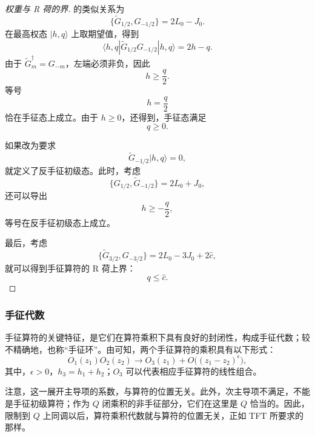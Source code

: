 \begin{proof}[权重与 R 荷的界]
的类似关系为
\[
\{\widetilde G_{1/2},G_{-1/2}\}=2L_0-J_0.
\]
在最高权态 $|h,q\rangle$ 上取期望值，得到
\[
\langle h,q|\widetilde G_{1/2}G_{-1/2}|h,q\rangle=2h-q.
\]
由于 $\widetilde G_m^\dagger=G_{-m}$，左端必须非负，因此
\begin{equation}\label{eq:3.95}
h\ge\frac q2.
\end{equation}
等号
\begin{equation}\label{eq:3.96}
h=\frac q2
\end{equation}
恰在手征态上成立。由于 $h\ge0$，还得到，手征态满足
\begin{equation}\label{eq:3.97}
q\ge0.
\end{equation}

如果改为要求
\[
\widetilde G_{-1/2}|h,q\rangle=0,
\]
就定义了反手征初级态。此时，考虑
\[
\{G_{1/2},\widetilde G_{-1/2}\}=2L_0+J_0,
\]
还可以导出
\[
h\ge-\frac q2,
\]
等号在反手征初级态上成立。

最后，考虑
\[
\{\widetilde G_{3/2},G_{-3/2}\}
=2L_0-3J_0+2\widehat c,
\]
就可以得到手征算符的 R 荷上界：
\begin{equation}\label{eq:3.98}
q\le\widehat c.
\end{equation}
\end{proof}

\subsubsection{手征代数}\label{sec:3.3.4.3}

手征算符的关键特征，是它们在算符乘积下具有良好的封闭性，构成手征代数；较不精确地，也称“手征环”。由可知，两个手征算符的乘积具有以下形式：
\begin{equation}\label{eq:3.99}
O_1(z_1)O_2(z_2)
\longrightarrow O_3(z_1)+O\bigl((z_1-z_2)^\epsilon\bigr),
\end{equation}
其中，$\epsilon>0$，$h_3=h_1+h_2$；$O_3$ 可以代表相应手征算符的线性组合。

注意，这一展开主导项的系数，与算符的位置无关。此外，次主导项不满足，不能是手征初级算符；作为 $Q$ 闭乘积的非手征部分，它们在这里是 $Q$ 恰当的。因此，限制到 $Q$ 上同调以后，算符乘积代数就与算符的位置无关，正如 TFT 所要求的那样。

